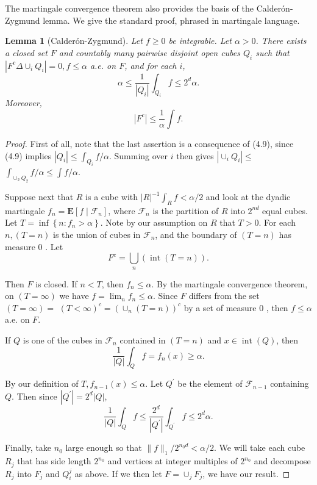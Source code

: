 \documentclass[twoside, 12pt]{book}
\numberwithin{equation}{chapter}
\newtheorem{lemma}[theorem]{Lemma}
\def\bE{{\mathbf E}}
\def\geq{\geqslant}
\def\leq{\leqslant}
\begin{document}
	
	 The martingale convergence theorem also provides the basis of the Calderón-Zygmund lemma. We give the standard proof, phrased in martingale language.
	 \begin{lemma}[Calderón-Zygmund]
	 	Let $f \geq 0$ be integrable. Let $\alpha>0$. There exists a closed set $F$ and countably many pairwise disjoint open cubes $Q_i$ such that $\left|F^c \Delta \cup_i Q_i\right|=0, f \leq \alpha$ a.e. on $F$, and for each $i$,
	 	$$
	 	\alpha \leq \frac{1}{\left|Q_i\right|} \int_{Q_i} f \leq 2^d \alpha .
	 	$$
	 	Moreover, 
	 	\[
	 	\left|F^c\right| \leq \frac{1}{\alpha} \int f .
	 	\]
	 \end{lemma}
	 \begin{proof}
	 	First of all, note that the last assertion is a consequence of (4.9), since (4.9) implies $\left|Q_i\right| \leq \int_{Q_i} f / \alpha$. Summing over $i$ then gives $\left|\cup_i Q_i\right| \leq$ $\int_{\cup_2 Q_2} f / \alpha \leq \int f / \alpha$.
	 	
	 	Suppose next that $R$ is a cube with $|R|^{-1} \int_R f<\alpha / 2$ and look at the dyadic martingale $f_n=\bE \left[f \mid \mathcal{F}_n\right]$, where $\mathcal{F}_n$ is the partition of $R$ into $2^{n d}$ equal cubes. Let $T=\inf \left\{n: f_n>\alpha\right\}$. Note by our assumption on $R$ that $T>0$. For each $n,(T=n)$ is the union of cubes in $\mathcal{F}_n$, and the boundary of $(T=n)$ has measure 0 . Let
	 	$$
	 	F^c=\bigcup_n(\operatorname{int}(T=n)) .
	 	$$
	 	
	 	Then $F$ is closed.
	 	If $n<T$, then $f_n \leq \alpha$. By the martingale convergence theorem, on $(T=\infty)$ we have $f=\lim _n f_n \leq \alpha$. Since $F$ differs from the set $(T=\infty)=$ $(T<\infty)^c=\left(\cup_n(T=n)\right)^c$ by a set of measure 0 , then $f \leq \alpha$ a.e. on $F$.
	 	
	 	If $Q$ is one of the cubes in $\mathcal{F}_n$ contained in $(T=n)$ and $x \in \operatorname{int}(Q)$, then
	 	$$
	 	\frac{1}{|Q|} \int_Q f=f_n(x) \geq \alpha .
	 	$$
	 	
	 	By our definition of $T, f_{n-1}(x) \leq \alpha$. Let $Q^{\prime}$ be the element of $\mathcal{F}_{n-1}$ containing $Q$. Then since $\left|Q^{\prime}\right|=2^d|Q|$,
	 	$$
	 	\frac{1}{|Q|} \int_Q f \leq \frac{2^d}{\left|Q^{\prime}\right|} \int_{Q^{\prime}} f \leq 2^d \alpha .
	 	$$
	 	
	 	Finally, take $n_0$ large enough so that $\|f\|_1 / 2^{n_0 d}<\alpha / 2$. We will take each cube $R_j$ that has side length $2^{n_0}$ and vertices at integer multiples of $2^{n_0}$ and decompose $R_j$ into $F_j$ and $Q_i^j$ as above. If we then let $F=\cup_j F_j$, we have our result.
	 \end{proof}
	
\end{document}
